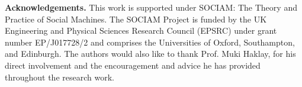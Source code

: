 \textbf{Acknowledgements.} This work is supported under SOCIAM: The Theory and Practice of Social Machines.  The SOCIAM Project is funded by the UK Engineering and Physical Sciences Research Council (EPSRC) under grant number EP/J017728/2 and comprises the Universities of Oxford, Southampton, and Edinburgh. The authors would also like to thank Prof. Muki Haklay, for his direct involvement and the encouragement and advice he has provided throughout the research work. 